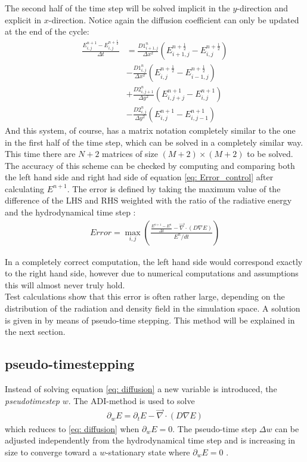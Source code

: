The second half of the time step will be solved implicit in the $y$-direction and explicit in $x$-direction. Notice again the diffusion coefficient can only be updated at the end of the cycle:
\begin{align}
\frac{E_{i,j}^{n+1} - E_{i,j}^{n+\frac{1}{2}}}{\Delta t}
 &= \frac{D1_{i+1,j}^{n}}{\Delta x^2} (E_{i+1,j}^{n+\frac{1}{2}} - E_{i,j}^{n+\frac{1}{2}}) \\
 &- \frac{D1_{i,j}^{n}}{\Delta x^2} (E_{i,j}^{n+\frac{1}{2}} - E_{i-1,j}^{n+\frac{1}{2}}) \\
 &+ \frac{D2_{i,j+1}^{n}}{\Delta y^2} (E_{i,j+j}^{n+1} - E_{i,j}^{n+1}) \\
 &- \frac{D2_{i,j}^{n}}{\Delta y^2} (E_{i,j}^{n+1} - E_{i,j-1}^{n+1})
\end{align}
And this system, of course, has a matrix notation completely similar to the one in the first half of the time step, which can be solved in a completely similar way. This time there are $N+2$ matrices of size $(M+2) \times (M+2)$ to be solved. \\

The accuracy of this scheme can be checked by computing and comparing both the left hand side and right had side of equation \eqref{eq: Error_control} after calculating $E^{n+1}$. The error is defined by taking the maximum value of the difference of the LHS and RHS weighted with the ratio of the radiative energy and the hydrodynamical time step \citep{Turner12001}:
\begin{align}
Error = \max_{i,j} \left(\frac{\frac{E^{n+1} - E^{n}}{\Delta t} -  \vec{\nabla} \cdot \left(D \nabla E\right)}{E^{n}/dt} \right) \label{eq: Error}
\end{align}

In a completely correct computation, the left hand side would correspond exactly to the right hand side, however due to numerical computations and assumptions this will almost never truly hold.\\

 Test calculations show that this error is often rather large, depending on the distribution of the radiation and density field in the simulation space. A solution is given in \citep{Turner12001} by means of pseudo-time stepping. This method will be explained in the next section.
 
 
\subsection{pseudo-timestepping}
Instead of solving equation \eqref{eq: diffusion} a new variable is introduced, the \emph{pseudotimestep} $w$. The ADI-method is used to solve 
\begin{align}
\partial_w E = \partial_t E  - \vec{\nabla} \cdot \left(D \nabla E\right)
\end{align}
which reduces to \eqref{eq: diffusion} when $\partial_w E = 0$. The pseudo-time step $\Delta w$ can be adjusted independently from the hydrodynamical time step and is increasing in size to converge toward a $w$-stationary state where $\partial_w E = 0$ \citep{Turner12001}.\\

